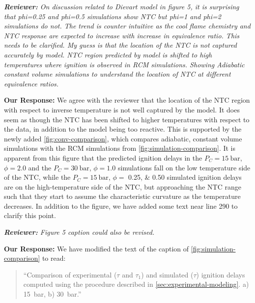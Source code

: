 \documentclass{article}
\newenvironment{reviewer}{\vspace{0.5\baselineskip}\begingroup\itshape\textbf{Reviewer:}}{\endgroup\vspace{0.5\baselineskip}}
\newenvironment{response}{\vspace{0.5\baselineskip}\textbf{Our Response:}}{\vspace{0.5\baselineskip}}
\begin{document}
\begin{reviewer}
    On discussion related to Dievart model in figure 5, it is surprising that phi=0.25 and phi=0.5
    simulations show NTC but phi=1 and phi=2 simulations do not. The trend is counter intuitive as
    the cool flame chemistry and NTC response are expected to increase with increase in equivalence
    ratio. This needs to be clarified. My guess is that the location of the NTC is not captured
    accurately by model. NTC region predicted by model is shifted to high temperatures where
    ignition is observed in RCM simulations. Showing Adiabatic constant volume simulations to
    understand the location of NTC at different equivalence ratios.
\end{reviewer}

\begin{response}
    We agree with the reviewer that the location of the NTC region with respect to inverse
    temperature is not well captured by the model. It does seem as though the NTC has been shifted
    to higher temperatures with respect to the data, in addition to the model being too reactive.
    This is supported by the newly added \cref{fig:conv-comparison}, which compares adiabatic,
    constant volume simulations with the RCM simulations from \cref{fig:simulation-comparison}. It
    is apparent from this figure that the predicted ignition delays in the $P_C = \SI{15}{\bar}$,
    $\phi = \num{2.0}$ and the $P_C = \SI{30}{\bar}$, $\phi = \num{1.0}$ simulations fall on the low
    temperature side of the NTC, while the $P_C = \SI{15}{\bar}$, $\phi =$ \numlist{0.25;0.50}
    simulated ignition delays are on the high-temperature side of the NTC, but approaching the NTC
    range such that they start to assume the characteristic curvature as the temperature decreases.
    In addition to the figure, we have added some text near line 290 to clarify this point.
\end{response}

\begin{reviewer}
    Figure 5 caption could also be revised.
\end{reviewer}

\begin{response}
    We have modified the text of the caption of \cref{fig:simulation-comparison} to read:

    \begin{quote}
        ``Comparison of experimental (\(\tau\) and \(\tau_1\)) and simulated (\(\tau\)) ignition delays
        computed using the procedure described in \cref{sec:experimental-modeling}. a)
        \SI{15}{\bar}, b) \SI{30}{\bar}.''
    \end{quote}
\end{response}
\end{document}
